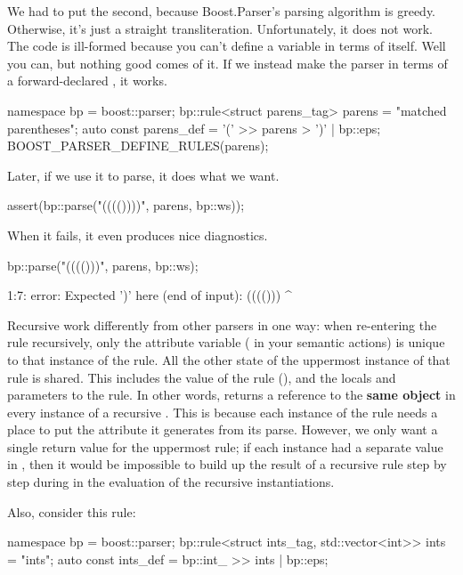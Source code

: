 \documentclass{MyBook}
\begin{document}
We had to put the  second, because Boost.Parser's parsing algorithm is greedy. Otherwise, it's just a straight transliteration. Unfortunately, it does not work. The code is ill-formed because you can't define a variable in terms of itself. Well you can, but nothing good comes of it. If we instead make the parser in terms of a forward-declared , it works.

\begin{code}
namespace bp = boost::parser;
bp::rule<struct parens_tag> parens = "matched parentheses";
auto const parens_def = '(' >> parens > ')' | bp::eps;
BOOST_PARSER_DEFINE_RULES(parens);
\end{code}

Later, if we use it to parse, it does what we want.

\begin{code}
assert(bp::parse("(((())))", parens, bp::ws));
\end{code}

When it fails, it even produces nice diagnostics.

\begin{code}
bp::parse("(((()))", parens, bp::ws);
\end{code}

\begin{code}
1:7: error: Expected ')' here (end of input):
(((()))
       ^
\end{code}

Recursive  work differently from other parsers in one way: when re-entering the rule recursively, only the attribute variable ( in your semantic actions) is unique to that instance of the rule. All the other state of the uppermost instance of that rule is shared. This includes the value of the rule (), and the locals and parameters to the rule. In other words,  returns a reference to the \textbf{same object} in every instance of a recursive . This is because each instance of the rule needs a place to put the attribute it generates from its parse. However, we only want a single return value for the uppermost rule; if each instance had a separate value in , then it would be impossible to build up the result of a recursive rule step by step during in the evaluation of the recursive instantiations.

Also, consider this rule:

\begin{code}
namespace bp = boost::parser;
bp::rule<struct ints_tag, std::vector<int>> ints = "ints";
auto const ints_def = bp::int_ >> ints | bp::eps;
\end{code}
\end{document}
